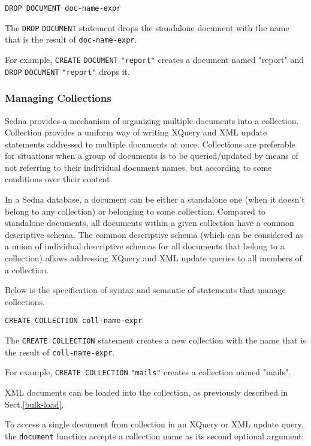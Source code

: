 \documentclass[a4paper,12pt]{article}
\begin{document}
\begin{verbatim}
DROP DOCUMENT doc-name-expr
\end{verbatim}

The \verb!DROP! \verb!DOCUMENT! statement drops the standalone document with the
name that is the result of \verb!doc-name-expr!.

For example, \verb!CREATE! \verb!DOCUMENT! \verb!"report"! creates a document named "report" and \verb!DROP! \verb!DOCUMENT! \verb!"report"! drops it.


\subsubsection{Managing Collections}

Sedna provides a mechanism of organizing multiple documents into a collection.
Collection provides a uniform way of writing XQuery and XML update statements
addressed to multiple documents at once.
Collections are preferable for situations when a group of documents is to be
queried/updated by means of not referring to their individual document names,
but according to some conditions over their content.

In a Sedna database, a document can be either a standalone one (when it
doesn't belong to any collection) or belonging to some collection.
Compared to standalone documents, all documents within a given collection have
a common descriptive schema.
The common descriptive schema (which can be considered as a union of
individual descriptive schemas for all documents that belong to a collection)
allows addressing XQuery and XML update queries to all members of a collection.

Below is the specification of syntax and semantic of statements that manage
collections.

\begin{verbatim}CREATE COLLECTION coll-name-expr\end{verbatim}

The \verb!CREATE COLLECTION! statement creates a new collection with the
name that is the result of \verb!coll-name-expr!.

For example, \verb!CREATE COLLECTION! \verb!"mails"! creates a collection named "mails".

XML documents can be loaded into the collection, as previously described in
Sect.\ref{bulk-load}.

To access a single document from collection in an XQuery or XML update query,
the \verb!document! function accepts a collection name as its second optional
argument:
\end{document}
